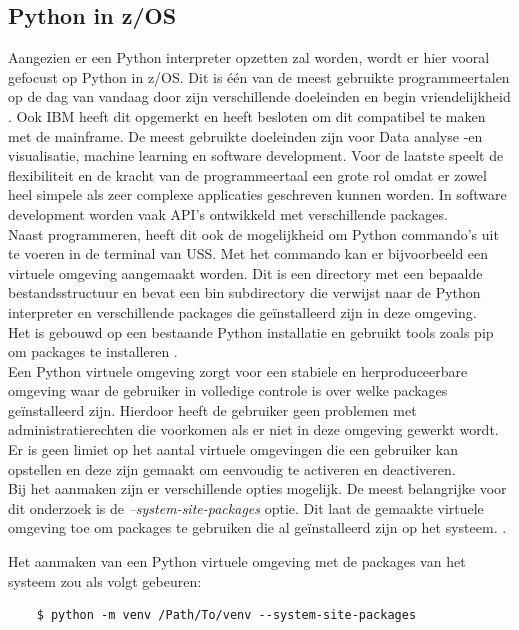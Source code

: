 \subsection{Python in z/OS}
Aangezien er een Python interpreter opzetten zal worden, wordt er hier vooral gefocust op Python in z/OS. Dit is één van de meest gebruikte programmeertalen op de dag van vandaag door zijn verschillende doeleinden en begin vriendelijkheid \autocite{Johnson2023}. Ook IBM heeft dit opgemerkt en heeft besloten om dit compatibel te maken met de mainframe. De meest gebruikte doeleinden zijn voor Data analyse -en visualisatie, machine learning en software development. Voor de laatste speelt de flexibiliteit en de kracht van de programmeertaal een grote rol omdat er zowel heel simpele als zeer complexe applicaties geschreven kunnen worden. In software development worden vaak API's ontwikkeld met verschillende packages. \autocite{Kosourova2022} \\

Naast programmeren, heeft dit ook de mogelijkheid om Python commando's uit te voeren in de terminal van USS. Met het  commando kan er bijvoorbeeld een virtuele omgeving aangemaakt worden. Dit is een directory met een bepaalde bestandsstructuur en bevat een bin subdirectory die verwijst naar de Python interpreter en verschillende packages die geïnstalleerd zijn in deze omgeving.  \autocite{UniPrinceton2022} \\
Het is gebouwd op een bestaande Python installatie en gebruikt tools zoals pip om packages te installeren \autocite{PSF2024}. \\

Een Python virtuele omgeving zorgt voor een stabiele en herproduceerbare omgeving waar de gebruiker in volledige controle is over welke packages geïnstalleerd zijn. Hierdoor heeft de gebruiker geen problemen met administratierechten die voorkomen als er niet in deze omgeving gewerkt wordt. Er is geen limiet op het aantal virtuele omgevingen die een gebruiker kan opstellen en deze zijn gemaakt om eenvoudig te activeren en deactiveren. \autocite{UniPrinceton2022} \\

Bij het aanmaken zijn er verschillende opties mogelijk. De meest belangrijke voor dit onderzoek is de \textit{--system-site-packages} optie. Dit laat de gemaakte virtuele omgeving toe om packages te gebruiken die al geïnstalleerd zijn op het systeem. \autocite{PSF2024}.

Het aanmaken van een Python virtuele omgeving met de packages van het systeem zou als volgt gebeuren:
\begin{lstlisting}
    $ python -m venv /Path/To/venv --system-site-packages
    
\end{lstlisting}

